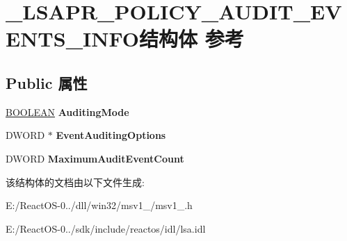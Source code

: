 \hypertarget{struct___l_s_a_p_r___p_o_l_i_c_y___a_u_d_i_t___e_v_e_n_t_s___i_n_f_o}{}\section{\+\_\+\+L\+S\+A\+P\+R\+\_\+\+P\+O\+L\+I\+C\+Y\+\_\+\+A\+U\+D\+I\+T\+\_\+\+E\+V\+E\+N\+T\+S\+\_\+\+I\+N\+F\+O结构体 参考}
\label{struct___l_s_a_p_r___p_o_l_i_c_y___a_u_d_i_t___e_v_e_n_t_s___i_n_f_o}
\subsection*{Public 属性}
\begin{DoxyCompactItemize}
\item 
\mbox{\label{struct___l_s_a_p_r___p_o_l_i_c_y___a_u_d_i_t___e_v_e_n_t_s___i_n_f_o_a1981136b0fd5f98076248d7b002ab018}} 
\hyperlink{_processor_bind_8h_a112e3146cb38b6ee95e64d85842e380a}{B\+O\+O\+L\+E\+AN} {\bfseries Auditing\+Mode}
\item 
\mbox{\label{struct___l_s_a_p_r___p_o_l_i_c_y___a_u_d_i_t___e_v_e_n_t_s___i_n_f_o_acd06b1eb60d6dea52ddc358bd7a680f2}} 
D\+W\+O\+RD $\ast$ {\bfseries Event\+Auditing\+Options}
\item 
\mbox{\label{struct___l_s_a_p_r___p_o_l_i_c_y___a_u_d_i_t___e_v_e_n_t_s___i_n_f_o_ad6af31cf9d836a26876d78b444febe06}} 
D\+W\+O\+RD {\bfseries Maximum\+Audit\+Event\+Count}
\end{DoxyCompactItemize}


该结构体的文档由以下文件生成\+:\begin{DoxyCompactItemize}
\item 
E\+:/\+React\+O\+S-\/0../dll/win32/msv1\+\_/msv1\+\_.\+h\item 
E\+:/\+React\+O\+S-\/0../sdk/include/reactos/idl/lsa.\+idl\end{DoxyCompactItemize}
